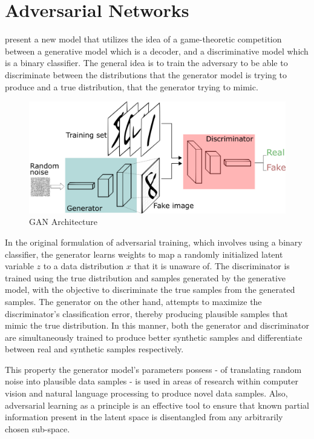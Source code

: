 \section{Adversarial Networks}

\cite{goodfellow2014generative} present a new model that utilizes the idea of a game-theoretic competition between a generative model which is a decoder, and a discriminative model which is a binary classifier. The general idea is to train the adversary to be able to discriminate between the distributions that the generator model is trying to produce and a true distribution, that the generator trying to mimic.

\begin{figure}[ht]
	\centering
	\includegraphics[width=\textwidth]{images/gans}
	\caption{\label{fig:gans} GAN Architecture}
\end{figure}

In the original formulation of adversarial training, which involves using a binary classifier, the generator learns weights to map a randomly initialized latent variable $z$ to a data distribution $x$ that it is unaware of. The discriminator is trained using the true distribution and samples generated by the generative model, with the objective to discriminate the true samples from the generated samples. The generator on the other hand, attempts to maximize the discriminator's classification error, thereby producing plausible samples that mimic the true distribution. In this manner, both the generator and discriminator are simultaneously trained to produce better synthetic samples and differentiate between real and synthetic samples respectively.

This property the generator model's parameters possess - of translating random noise into plausible data samples - is used in areas of research within computer vision and natural language processing to produce novel data samples. Also, adversarial learning as a principle is an effective tool to ensure that known partial information present in the latent space is disentangled from any arbitrarily chosen sub-space.

